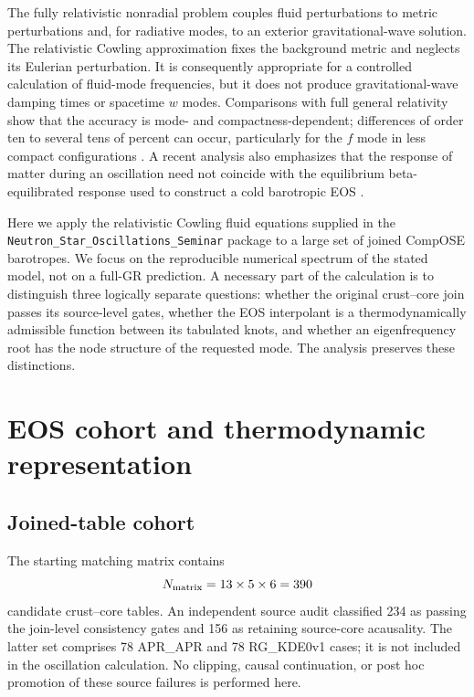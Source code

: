 \documentclass[aps,prd,twocolumn,superscriptaddress,nofootinbib]{revtex4-2}
\begin{document}
The fully relativistic nonradial problem couples fluid perturbations to metric perturbations and, for radiative modes, to an exterior gravitational-wave solution. The relativistic Cowling approximation fixes the background metric and neglects its Eulerian perturbation. It is consequently appropriate for a controlled calculation of fluid-mode frequencies, but it does not produce gravitational-wave damping times or spacetime $w$ modes. Comparisons with full general relativity show that the accuracy is mode- and compactness-dependent; differences of order ten to several tens of percent can occur, particularly for the $f$ mode in less compact configurations \cite{YoshidaKojima1997,Kokkotas1996}. A recent analysis also emphasizes that the response of matter during an oscillation need not coincide with the equilibrium beta-equilibrated response used to construct a cold barotropic EOS \cite{Montefusco2025}.

Here we apply the relativistic Cowling fluid equations supplied in the \texttt{Neutron\_Star\_Oscillations\_Seminar} package to a large set of joined CompOSE barotropes. We focus on the reproducible numerical spectrum of the stated model, not on a full-GR prediction. A necessary part of the calculation is to distinguish three logically separate questions: whether the original crust--core join passes its source-level gates, whether the EOS interpolant is a thermodynamically admissible function between its tabulated knots, and whether an eigenfrequency root has the node structure of the requested mode. The analysis preserves these distinctions.

\section{EOS cohort and thermodynamic representation}

\subsection{Joined-table cohort}

The starting matching matrix contains
\begin{equation}
N_{\rm matrix}=13\times 5\times 6=390
\end{equation}
candidate crust--core tables. An independent source audit classified 234 as passing the join-level consistency gates and 156 as retaining source-core acausality. The latter set comprises 78 APR\_APR and 78 RG\_KDE0v1 cases; it is not included in the oscillation calculation. No clipping, causal continuation, or post hoc promotion of these source failures is performed here.
\end{document}

